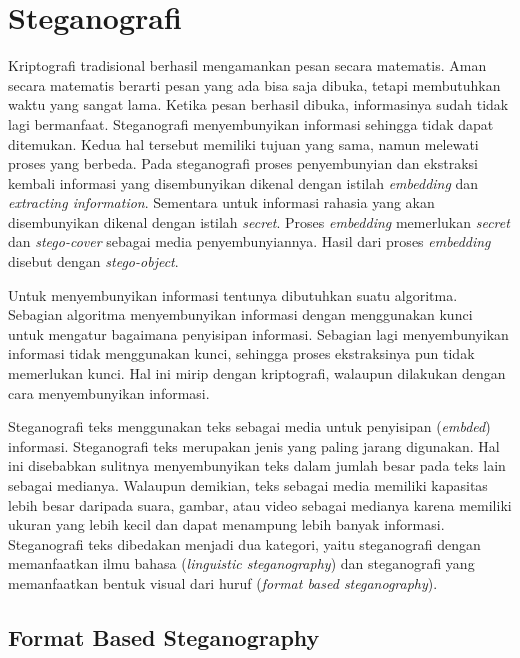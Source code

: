 \section{Steganografi}
\label{sec:steganografi}

Kriptografi\cite{Dpcrypto:2009} tradisional berhasil mengamankan pesan secara matematis. Aman secara matematis berarti pesan yang ada bisa saja dibuka, tetapi membutuhkan waktu yang sangat lama. Ketika pesan berhasil dibuka, informasinya sudah tidak lagi bermanfaat. Steganografi menyembunyikan informasi sehingga tidak dapat ditemukan. Kedua hal tersebut memiliki tujuan yang sama, namun melewati proses yang berbeda. Pada steganografi proses penyembunyian dan ekstraksi kembali informasi yang disembunyikan dikenal dengan istilah \textit{embedding} dan \textit{extracting information}.  Sementara untuk informasi rahasia yang akan disembunyikan dikenal dengan istilah \textit{secret}. Proses \textit{embedding} memerlukan \textit{secret} dan \textit{stego-cover} sebagai media penyembunyiannya. Hasil dari proses \textit{embedding} disebut dengan \textit{stego-object}.

Untuk menyembunyikan informasi tentunya dibutuhkan suatu algoritma. Sebagian algoritma menyembunyikan informasi dengan menggunakan kunci untuk mengatur bagaimana penyisipan informasi. Sebagian lagi menyembunyikan informasi tidak menggunakan kunci, sehingga proses ekstraksinya pun tidak memerlukan kunci. Hal ini mirip dengan kriptografi, walaupun dilakukan dengan cara menyembunyikan informasi.

Steganografi teks menggunakan teks sebagai media untuk penyisipan (\textit{embded}) informasi.  Steganografi teks merupakan jenis yang paling jarang digunakan. Hal ini disebabkan sulitnya menyembunyikan teks dalam jumlah besar pada teks lain sebagai medianya. Walaupun demikian, teks sebagai media memiliki kapasitas lebih besar daripada suara, gambar, atau video sebagai medianya karena memiliki ukuran yang lebih kecil dan dapat menampung lebih banyak informasi. Steganografi teks dibedakan menjadi dua kategori, yaitu steganografi dengan memanfaatkan ilmu bahasa (\textit{linguistic steganography}) dan steganografi yang memanfaatkan bentuk visual dari huruf (\textit{format based steganography}).

\subsection{Format Based Steganography\cite{fbs:2009}}
\label{sec:fb_stegano}

